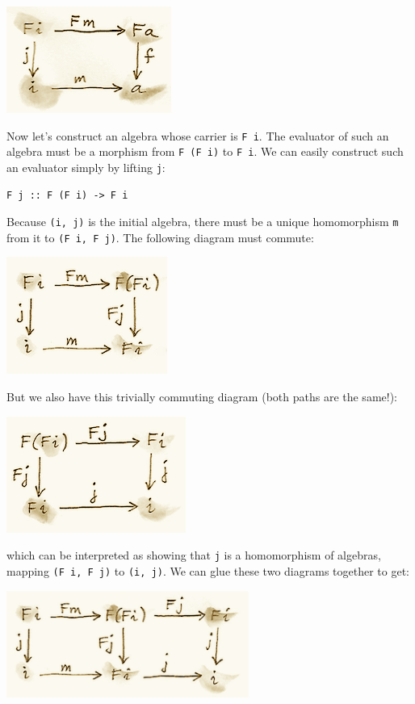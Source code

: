 \includegraphics{images/alg2.png}

Now let's construct an algebra whose carrier is \texttt{F\ i}. The
evaluator of such an algebra must be a morphism from \texttt{F\ (F\ i)}
to \texttt{F\ i}. We can easily construct such an evaluator simply by
lifting \texttt{j}:

\begin{verbatim}
F j :: F (F i) -> F i
\end{verbatim}

Because \texttt{(i,\ j)} is the initial algebra, there must be a unique
homomorphism \texttt{m} from it to \texttt{(F\ i,\ F\ j)}. The following
diagram must commute:

\includegraphics{images/alg3a.png}

But we also have this trivially commuting diagram (both paths are the
same!):

\includegraphics{images/alg3.png}

which can be interpreted as showing that \texttt{j} is a homomorphism of
algebras, mapping \texttt{(F\ i,\ F\ j)} to \texttt{(i,\ j)}. We can
glue these two diagrams together to get:

\includegraphics[width=3.12500in]{images/alg4.png}

